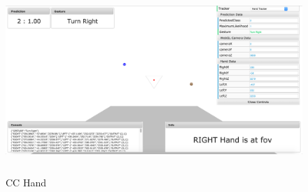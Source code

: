 \begin{figure}
	[h] \centering 
	\includegraphics[height=7cm]{figures/content/cc-hand.png} \caption{CC Hand} \label{fg:cc:hand} 
\end{figure}